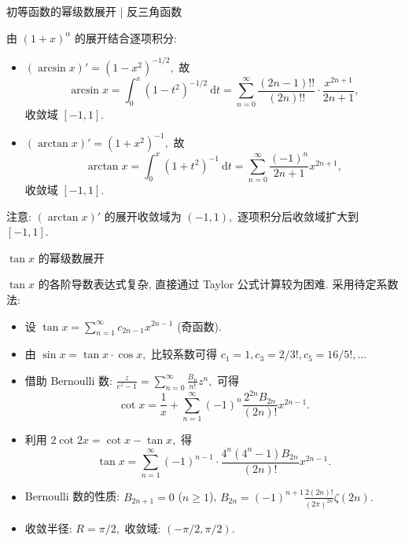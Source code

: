 
\begin{frame}{初等函数的幂级数展开 | 反三角函数}

由 $(1+x)^\alpha$ 的展开结合逐项积分:

\pause

\begin{itemize}
\item $(\arcsin x)' = (1-x^2)^{-1/2},$ 故
\[\arcsin x = \int_0^x (1-t^2)^{-1/2} ~ \mathrm{d}t = \sum_{n=0}^\infty \frac{(2n-1)!!}{(2n)!!} \cdot \frac{x^{2n+1}}{2n+1},\]
收敛域 $[-1, 1].$
\pause
\item $(\arctan x)' = (1+x^2)^{-1},$ 故
\[\arctan x = \int_0^x (1+t^2)^{-1} ~ \mathrm{d}t = \sum_{n=0}^\infty \frac{(-1)^n}{2n+1} x^{2n+1},\]
收敛域 $[-1, 1].$
\end{itemize}

\pause

注意: $(\arctan x)'$ 的展开收敛域为 $(-1, 1),$ 逐项积分后收敛域扩大到 $[-1, 1].$

\end{frame}


\begin{frame}{$\tan x$ 的幂级数展开}

$\tan x$ 的各阶导数表达式复杂, 直接通过 Taylor 公式计算较为困难. 采用待定系数法:

\pause
\vspace{0.5em}

\begin{itemize}[<+->]
\item 设 $\tan x = \sum_{n=1}^\infty c_{2n-1} x^{2n-1}$ (奇函数).
\item 由 $\sin x = \tan x \cdot \cos x,$ 比较系数可得 $c_1=1, c_3=2/3!, c_5=16/5!, \dots$
\item 借助 Bernoulli 数: $\frac{z}{e^z-1} = \sum_{n=0}^\infty \frac{B_n}{n!} z^n,$ 可得
  \[\cot x = \frac{1}{x} + \sum_{n=1}^\infty (-1)^n \frac{2^{2n} B_{2n}}{(2n)!} x^{2n-1}.\]
\item 利用 $2\cot 2x = \cot x - \tan x,$ 得
  \[\tan x = \sum_{n=1}^\infty (-1)^{n-1} \cdot \frac{4^n(4^n-1) B_{2n}}{(2n)!} x^{2n-1}.\]
\item Bernoulli 数的性质: $B_{2n+1} = 0$ ($n \geqslant 1$), $B_{2n} = (-1)^{n+1} \frac{2(2n)!}{(2\pi)^{2n}} \zeta(2n).$
\item 收敛半径: $R = \pi/2,$ 收敛域: $(-\pi/2, \pi/2).$
\end{itemize}

\end{frame}

